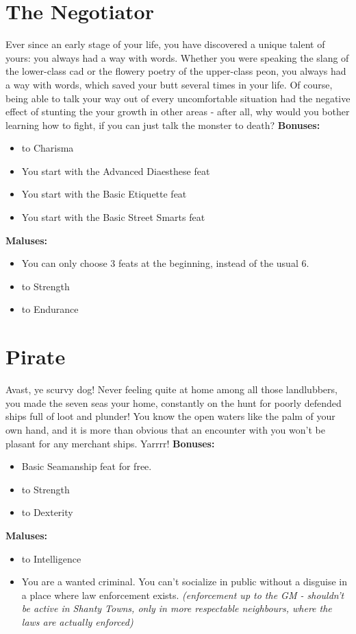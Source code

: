 \documentclass[openany,10pt,a4paper]{book}
\begin{document}
\begin{itemize}
\begin{itemize}
\begin{itemize}
\begin{itemize}
\section{The Negotiator}
Ever since an early stage of your life, you have discovered a unique talent of yours: you always had a way with words. Whether you were speaking the slang of the lower-class cad or the flowery poetry of the upper-class peon, you always had a way with words, which saved your butt several times in your life. Of course, being able to talk your way out of every uncomfortable situation had the negative effect of stunting the your growth in other areas - after all, why would you bother learning how to fight, if you can just talk the monster to death?\newline
\textbf{Bonuses:}
\begin{itemize}
	\item {} to Charisma
	\item You start with the Advanced Diaesthese feat
	\item You start with the Basic Etiquette feat
	\item You start with the Basic Street Smarts feat
\end{itemize}
\textbf{Maluses:}
\begin{itemize}
	\item You can only choose 3 feats at the beginning, instead of the usual 6.
	\item {} to Strength
	\item {} to Endurance
\end{itemize}
\section{Pirate}
Avast, ye scurvy dog! Never feeling quite at home among all those landlubbers, you made the seven seas your home, constantly on the hunt for poorly defended ships full of loot and plunder! You know the open waters like the palm of your own hand, and it is more than obvious that an encounter with you won't be plasant for any merchant ships. Yarrrr!\newline
\textbf{Bonuses:}
\begin{itemize}
	\item Basic Seamanship feat for free.
	\item {} to Strength
	\item {} to Dexterity
\end{itemize}
\textbf{Maluses:}
\begin{itemize}
	\item {} to Intelligence
	\item You are a wanted criminal. You can't socialize in public without a disguise in a place where law enforcement exists. \textit{(enforcement up to the GM - shouldn't be active in Shanty Towns, only in more respectable neighbours, where the laws are actually enforced)}
\end{itemize}

\end{itemize}
\end{itemize}
\end{itemize}
\end{itemize}
\end{document}
